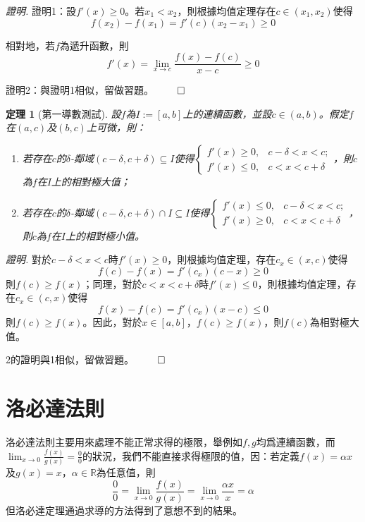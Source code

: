 \documentclass[12pt]{article}
\newtheorem*{theorem}{定理}
\renewenvironment*{proof}{\textit{證明.}}{\hfill$\qed$}
\begin{document}
    \begin{proof}
        證明1：設$f'(x)\geq 0$。若$x_1<x_2$，則根據均值定理存在$c\in(x_1,x_2)$使得$$f(x_2)-f(x_1)=f'(c)(x_2-x_1)\geq 0$$
        
        相對地，若$f$為遞升函數，則$$f'(x)=\lim_{x\to c}\frac{f(x)-f(c)}{x-c}\geq 0$$

        證明2：與證明1相似，留做習題。
    \end{proof}

    \begin{theorem}[第一導數測試]
        設$f$為$I:=[a,b]$上的連續函數，並設$c\in(a,b)$。假定$f$在$(a,c)$及$(b,c)$上可微，則：\begin{enumerate}
            \item 若存在$c$的$\delta$-鄰域$(c-\delta,c+\delta)\subseteq I$使得$\begin{cases}
                f'(x)\geq 0, &c-\delta<x<c;\\
                f'(x)\leq 0, &c<x<c+\delta
            \end{cases}$，則$c$為$f$在$I$上的相對極大值；
            \item 若存在$c$的$\delta$-鄰域$(c-\delta,c+\delta)\cap I\subseteq I$使得$\begin{cases}
                f'(x)\leq 0, &c-\delta<x<c;\\
                f'(x)\geq 0, &c<x<c+\delta
            \end{cases}$，則$c$為$f$在$I$上的相對極小值。
        \end{enumerate}
    \end{theorem}

    \begin{proof}
        對於$c-\delta<x<c$時$f'(x)\geq 0$，則根據均值定理，存在$c_x\in(x,c)$使得$$f(c)-f(x)=f'(c_x)(c-x)\geq 0$$則$f(c)\geq f(x)$；同理，對於$c<x<c+\delta$時$f'(x)\leq 0$，則根據均值定理，存在$c_x\in(c,x)$使得$$f(x)-f(c)=f'(c_x)(x-c)\leq 0$$則$f(c)\geq f(x)$。因此，對於$x\in[a,b]$，$f(c)\geq f(x)$，則$f(c)$為相對極大值。

        2的證明與1相似，留做習題。
    \end{proof}

    \section*{洛必達法則}

    洛必達法則主要用來處理不能正常求得的極限，舉例如$f,g$均爲連續函數，而$\displaystyle\lim_{x\to 0}\frac{f(x)}{g(x)}=\frac{0}{0}$的狀況，我們不能直接求得極限的值，因：若定義$f(x)=\alpha x$及$g(x)=x$，$\alpha\in\mathbb{R}$為任意值，則$$\frac{0}{0}=\lim_{x\to 0}\frac{f(x)}{g(x)}=\lim_{x\to 0}\frac{\alpha x}{x}=\alpha$$但洛必達定理通過求導的方法得到了意想不到的結果。
\end{document}

